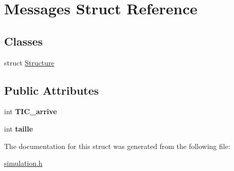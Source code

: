 \hypertarget{structMessages}{}\section{Messages Struct Reference}
\label{structMessages}
\subsection*{Classes}
\begin{DoxyCompactItemize}
\item 
struct \hyperlink{structMessages_1_1Structure}{Structure}
\end{DoxyCompactItemize}
\subsection*{Public Attributes}
\begin{DoxyCompactItemize}
\item 
int {\bfseries T\+I\+C\+\_\+arrive}\hypertarget{structMessages_a9a9d3325111fa2d5c81a39c70d8ff763}{}\label{structMessages_a9a9d3325111fa2d5c81a39c70d8ff763}

\item 
int {\bfseries taille}\hypertarget{structMessages_ade54b5136b839d45e2c25a978a824939}{}\label{structMessages_ade54b5136b839d45e2c25a978a824939}

\end{DoxyCompactItemize}


The documentation for this struct was generated from the following file\+:\begin{DoxyCompactItemize}
\item 
\hyperlink{simulation_8h}{simulation.\+h}\end{DoxyCompactItemize}
